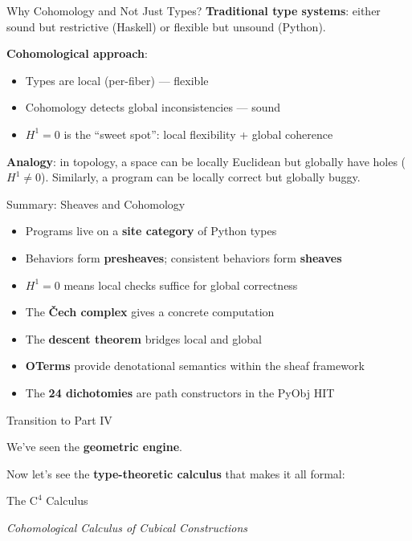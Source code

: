 \documentclass[aspectratio=169,11pt]{beamer}
\newcommand{\Cfour}{\mathrm{C}^4}
\begin{document}
\begin{frame}{Why Cohomology and Not Just Types?}
\textbf{Traditional type systems}: either sound but restrictive (Haskell) or flexible but unsound (Python).

\vspace{0.5em}
\textbf{Cohomological approach}: 
\begin{itemize}
\item Types are local (per-fiber) --- flexible
\item Cohomology detects global inconsistencies --- sound
\item $H^1 = 0$ is the ``sweet spot'': local flexibility + global coherence
\end{itemize}

\vspace{0.5em}
\textbf{Analogy}: in topology, a space can be locally Euclidean but globally have holes ($H^1 \neq 0$). Similarly, a program can be locally correct but globally buggy.
\end{frame}

\begin{frame}{Summary: Sheaves and Cohomology}
\begin{itemize}
\item Programs live on a \textbf{site category} of Python types
\item Behaviors form \textbf{presheaves}; consistent behaviors form \textbf{sheaves}
\item \textbf{$H^1 = 0$} means local checks suffice for global correctness
\item The \textbf{\v{C}ech complex} gives a concrete computation
\item The \textbf{descent theorem} bridges local and global
\item \textbf{OTerms} provide denotational semantics within the sheaf framework
\item The \textbf{24 dichotomies} are path constructors in the PyObj HIT
\end{itemize}
\end{frame}

\begin{frame}{Transition to Part IV}
\begin{center}
{\Large We've seen the \textbf{geometric engine}.}

\vspace{1em}
Now let's see the \textbf{type-theoretic calculus} that makes it all formal:

\vspace{1em}
{\LARGE\color{blue} The $\Cfour$ Calculus}

\vspace{0.5em}
\emph{Cohomological Calculus of Cubical Constructions}
\end{center}
\end{frame}
\end{document}
